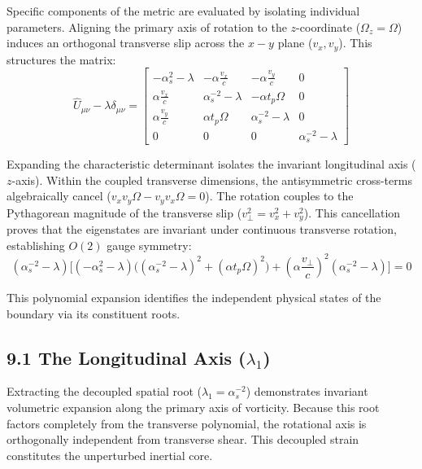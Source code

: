 Specific components of the metric are evaluated by isolating individual parameters. Aligning the primary axis of rotation to the $z$-coordinate ($\Omega_z = \Omega$) induces an orthogonal transverse slip across the $x-y$ plane ($v_x, v_y$). This structures the matrix: 
\begin{equation} 
    \hat{U}_{\mu\nu} - \lambda \delta_{\mu\nu} = \begin{bmatrix} 
    -\alpha_s^2 - \lambda & -\alpha \frac{v_x}{c} & -\alpha \frac{v_y}{c} & 0 \\ 
    \alpha \frac{v_x}{c} & \alpha_s^{-2} - \lambda & -\alpha t_p \Omega & 0 \\ 
    \alpha \frac{v_y}{c} & \alpha t_p \Omega & \alpha_s^{-2} - \lambda & 0 \\ 
    0 & 0 & 0 & \alpha_s^{-2} - \lambda 
    \end{bmatrix} 
\end{equation} 

Expanding the characteristic determinant isolates the invariant longitudinal axis ($z$-axis). Within the coupled transverse dimensions, the antisymmetric cross-terms algebraically cancel ($v_x v_y \Omega - v_y v_x \Omega = 0$). The rotation couples to the Pythagorean magnitude of the transverse slip ($v_\perp^2 = v_x^2 + v_y^2$). This cancellation proves that the eigenstates are invariant under continuous transverse rotation, establishing $O(2)$ gauge symmetry: 
\begin{equation} 
    (\alpha_s^{-2} - \lambda) \Big[ (-\alpha_s^2 - \lambda) \big( (\alpha_s^{-2} - \lambda)^2 + (\alpha t_p \Omega)^2 \big) + \left(\alpha \frac{v_\perp}{c}\right)^2 (\alpha_s^{-2} - \lambda) \Big] = 0 
\end{equation}

This polynomial expansion identifies the independent physical states of the boundary via its constituent roots. 

\vspace{0.2cm} 

\subsection*{9.1 The Longitudinal Axis ($\lambda_1$)} 
Extracting the decoupled spatial root ($\lambda_1 = \alpha_s^{-2}$) demonstrates invariant volumetric expansion along the primary axis of vorticity. Because this root factors completely from the transverse polynomial, the rotational axis is orthogonally independent from transverse shear. This decoupled strain constitutes the unperturbed inertial core. 

